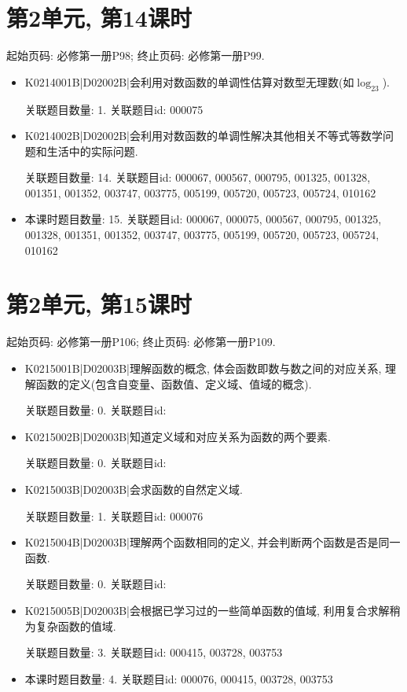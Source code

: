 \section*{第2单元, 第14课时}
起始页码: 必修第一册P98; 终止页码: 必修第一册P99.
\begin{itemize}
\item K0214001B|D02002B|会利用对数函数的单调性估算对数型无理数(如$\log_23$).

关联题目数量: 1. 关联题目id: 000075

\item K0214002B|D02002B|会利用对数函数的单调性解决其他相关不等式等数学问题和生活中的实际问题.

关联题目数量: 14. 关联题目id: 000067, 000567, 000795, 001325, 001328, 001351, 001352, 003747, 003775, 005199, 005720, 005723, 005724, 010162

\item 本课时题目数量: 15. 关联题目id: 000067, 000075, 000567, 000795, 001325, 001328, 001351, 001352, 003747, 003775, 005199, 005720, 005723, 005724, 010162

\end{itemize}

\section*{第2单元, 第15课时}
起始页码: 必修第一册P106; 终止页码: 必修第一册P109.
\begin{itemize}
\item K0215001B|D02003B|理解函数的概念, 体会函数即数与数之间的对应关系, 理解函数的定义(包含自变量、函数值、定义域、值域的概念).

关联题目数量: 0. 关联题目id: 

\item K0215002B|D02003B|知道定义域和对应关系为函数的两个要素.

关联题目数量: 0. 关联题目id: 

\item K0215003B|D02003B|会求函数的自然定义域.

关联题目数量: 1. 关联题目id: 000076

\item K0215004B|D02003B|理解两个函数相同的定义, 并会判断两个函数是否是同一函数.

关联题目数量: 0. 关联题目id: 

\item K0215005B|D02003B|会根据已学习过的一些简单函数的值域, 利用复合求解稍为复杂函数的值域.

关联题目数量: 3. 关联题目id: 000415, 003728, 003753

\item 本课时题目数量: 4. 关联题目id: 000076, 000415, 003728, 003753

\end{itemize}

